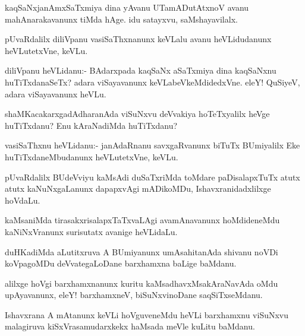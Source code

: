 \begin{mng}
kaqSaNxjanAmxSaTxmiya dina yAvanu UTamADutAtxnoV avanu mahAnarakavanunx tiMda hAge. idu satayxvu, saMshayavilalx.
\end{mng}

\begin{mng}
pUvaRdalilx diliVpanu vasiSaThxnanunx keVLalu avanu heVLidudanunx heVLutetxVne, keVLu.
\end{mng}

\begin{mng}
diliVpanu heVLidanu:- BAdarxpada kaqSaNx aSaTxmiya dina kaqSaNxnu huTiTxdanaSeTx? adara viSayavanunx keVLabeVkeMdidedxVne. eleY! QuSiyeV, adara viSayavanunx heVLu.
\end{mng}

\begin{mng}
shaMKacakarxgadAdharanAda viSuNxvu deVvakiya hoTeTxyalilx heVge huTiTxdanu? Enu kAraNadiMda huTiTxdanu?
\end{mng}

\begin{mng}
vasiSaThxnu heVLidanu:- janAdaRnanu savxgaRvanunx biTuTx BUmiyalilx Eke huTiTxdaneMbudanunx heVLutetxVne, keVLu.
\end{mng}

\begin{mng}
pUvaRdalilx BUdeVviyu kaMsAdi duSaTxriMda toMdare paDisalapxTuTx atutx atutx kaNuNxgaLanunx dapapxvAgi mADikoMDu, Ishavxranidadxlilxge hoVdaLu.
\end{mng}

\begin{mng}
kaMsaniMda tirasakxrisalapxTaTxvaLAgi avamAnavanunx hoMdideneMdu kaNiNxVranunx surisutatx avanige heVLidaLu.
\end{mng}

\begin{mng}
duHKadiMda aLutitxruva A BUmiyanunx umAsahitanAda shivanu noVDi koVpagoMDu deVvategaLoDane barxhamxna baLige baMdanu.
\end{mng}

\begin{mng}
alilxge hoVgi barxhamxnanunx kuritu kaMsadhavxMsakAraNavAda oMdu upAyavanunx, eleY! barxhamxneV, biSuNxvinoDane saqSiTxseMdanu.
\end{mng}

\begin{mng}
Ishavxrana A mAtanunx keVLi hoVguveneMdu heVLi barxhamxnu viSuNxvu malagiruva kiSxVrasamudarxkekx haMsada meVle kuLitu baMdanu.
\end{mng}

